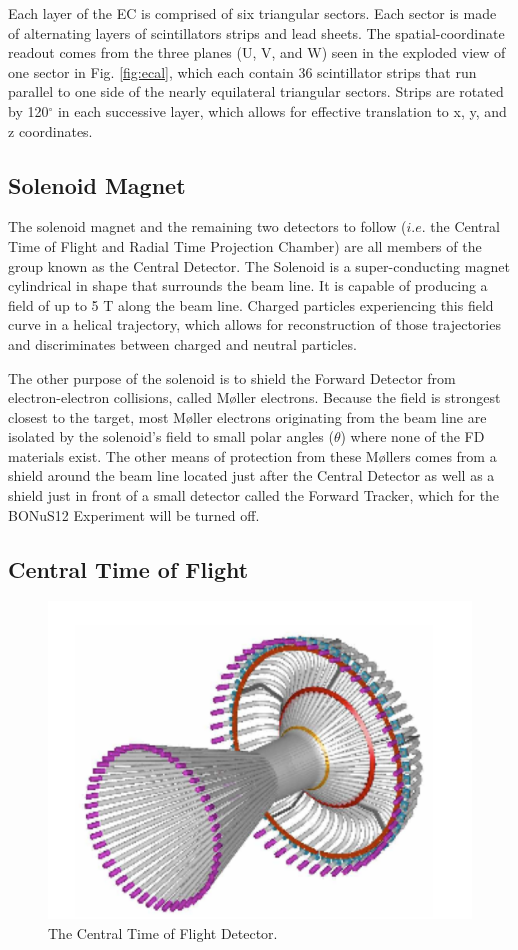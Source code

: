 Each layer of the EC is comprised of six triangular sectors. Each sector is made of alternating layers of scintillators strips and lead sheets. The spatial-coordinate readout comes from the three planes (U, V, and W) seen in the exploded view of one sector in Fig. \ref{fig:ecal}, which each contain 36 scintillator strips that run parallel to one side of the nearly equilateral triangular sectors. Strips are rotated by 120$^{\circ}$ in each successive layer, which allows for effective translation to x, y, and z coordinates.  

\subsection{Solenoid Magnet}
The solenoid magnet and the remaining two detectors to follow ($i.e.$ the Central Time of Flight and Radial Time Projection Chamber) are all members of the group known as the Central Detector. The Solenoid is a super-conducting magnet cylindrical in shape that surrounds the beam line. It is capable of producing a field of up to 5 T along the beam line. Charged particles experiencing this field curve in a helical trajectory, which allows for reconstruction of those trajectories and discriminates between charged and neutral particles.

The other purpose of the solenoid is to shield the Forward Detector from electron-electron collisions, called M\o ller electrons. Because the field is strongest closest to the target, most M\o ller electrons originating from the beam line are isolated by the solenoid's field to small polar angles ($\theta$) where none of the FD materials exist. The other means of protection from these M\o llers comes from a shield around the beam line located just after the Central Detector as well as a shield just in front of a small detector called the Forward Tracker, which for the BONuS12 Experiment will be turned off.
 
\subsection{Central Time of Flight}
\begin{figure}
	\centering
	\includegraphics[width=0.9\linewidth]{figures/ctof.png}
	\caption{\label{fig:ctof}The Central Time of Flight Detector.}
\end{figure}

